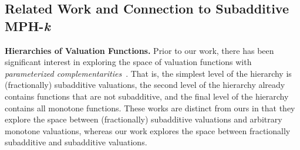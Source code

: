 \documentclass[11pt]{article}\usepackage{amsfonts}
\numberwithin{theorem}{subsection}
\def\hmath$#1${\texorpdfstring{{\rmfamily\textit{#1}}}{#1}}
\begin{document}
\subsection{Related Work and Connection to Subadditive MPH-\hmath$k$}

\noindent\textbf{Hierarchies of Valuation Functions.} Prior to our work, there has been significant interest in exploring the space of valuation functions with \emph{parameterized complementarities}~\cite{AbrahamBDR12,FeigeFIILS15,FeigeI13,FeldmanFMR16,FeldmanI14,FeldmanI17, EdenFFTW21}. That is, the simplest level of the hierarchy is (fractionally) subadditive valuations, the second level of the hierarchy already contains functions that are not subadditive, and the final level of the hierarchy contains all monotone functions. These works are distinct from ours in that they explore the space between (fractionally) subadditive valuations and arbitrary monotone valuations, whereas our work explores the space between fractionally subadditive and subadditive valuations. 
\end{document}
